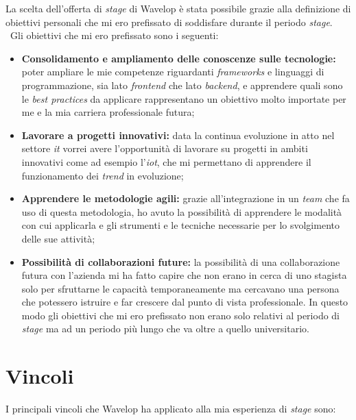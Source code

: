 La scelta dell'offerta di \emph{stage} di Wavelop è stata possibile grazie alla definizione di obiettivi personali che mi ero prefissato di soddisfare durante il periodo \emph{stage}. \
Gli obiettivi che mi ero prefissato sono i seguenti:
\begin{itemize}
  \item \textbf{Consolidamento e ampliamento delle conoscenze sulle tecnologie:} poter ampliare le mie competenze riguardanti \emph{frameworks} e linguaggi di programmazione, sia lato \emph{\gls{frontend}} che lato \emph{\gls{backend}}, e apprendere quali sono le \emph{best practices} da applicare rappresentano un obiettivo molto importate per me e la mia carriera professionale futura;
  \item \textbf{Lavorare a progetti innovativi:} data la continua evoluzione in atto nel settore \emph{\acrshort{it}} vorrei avere l'opportunità di lavorare su progetti in ambiti innovativi come ad esempio l'\emph{\acrlong{iot}}, che mi permettano di apprendere il funzionamento dei \emph{trend} in evoluzione;
  \item \textbf{Apprendere le metodologie agili:} grazie all'integrazione in un \emph{team} che fa uso di questa metodologia, ho avuto la possibilità di apprendere le modalità con cui applicarla e gli strumenti e le tecniche necessarie per lo svolgimento delle sue attività;
  \item \textbf{Possibilità di collaborazioni future:} la possibilità di una collaborazione futura con l'azienda mi ha fatto capire che non erano in cerca di uno stagista solo per sfruttarne le capacità temporaneamente ma cercavano una persona che potessero istruire e far crescere dal punto di vista professionale. In questo modo gli obiettivi che mi ero prefissato non erano solo relativi al periodo di \emph{stage} ma ad un periodo più lungo che va oltre a quello universitario.
\end{itemize}

\section{Vincoli}

I principali vincoli che Wavelop ha applicato alla mia esperienza di \emph{stage} sono:
